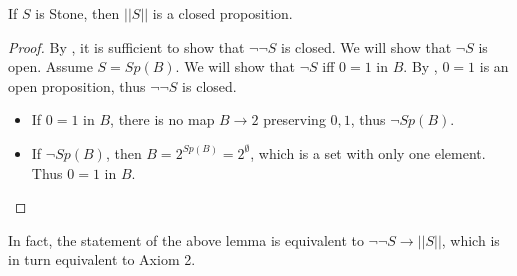 \begin{lemma}\label{LemInhabitedOfStoneIsClosed}
  If $S$ is Stone, then $||S||$ is a closed proposition. 
\end{lemma} 
\begin{proof}
  By , it is sufficient to show that 
  $\neg \neg S$ is closed. We will show that $\neg S$ is open. 
  Assume $S= Sp(B)$. We will show that $\neg S$ iff $0=1$ in $B$. 
  By , $0=1$ is an open proposition, thus $\neg \neg S$ is closed. 
  \begin{itemize}
    \item If $0=1$ in $B$, there is no map $B\to 2$ preserving $0,1$, thus $\neg Sp(B)$. 
    \item If $\neg Sp(B)$, then $B=2^{Sp(B)}=2^\emptyset$, which is a set with only one element. Thus $0=1$ in $B$. 
  \end{itemize}
\end{proof}
In fact, the statement of the above lemma is equivalent to 
$\neg \neg S \to ||S||$, which is in turn equivalent to Axiom 2. 


